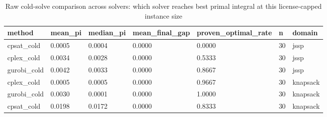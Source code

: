 \begin{table}[t]
\centering
\begin{tabular}{lllllll}
\toprule
method & mean\_pi & median\_pi & mean\_final\_gap & proven\_optimal\_rate & n & domain \\
\midrule
cpsat\_cold & 0.0005 & 0.0004 & 0.0000 & 0.0000 & 30 & jssp \\
cplex\_cold & 0.0034 & 0.0028 & 0.0000 & 0.5333 & 30 & jssp \\
gurobi\_cold & 0.0042 & 0.0033 & 0.0000 & 0.8667 & 30 & jssp \\
cplex\_cold & 0.0005 & 0.0005 & 0.0000 & 0.9667 & 30 & knapsack \\
gurobi\_cold & 0.0030 & 0.0001 & 0.0000 & 1.0000 & 30 & knapsack \\
cpsat\_cold & 0.0198 & 0.0172 & 0.0000 & 0.8333 & 30 & knapsack \\
\bottomrule
\end{tabular}
\caption{Raw cold-solve comparison across solvers: which solver reaches best primal integral at this license-capped instance size}
\label{tab:multisolver-speed}
\end{table}
